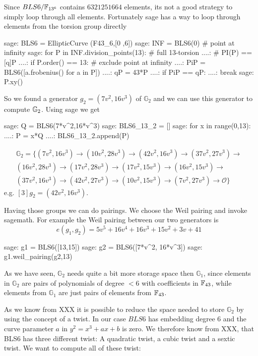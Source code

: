 Since $BLS6/\mathbb{F}_{13^6}$ contains $6321251664$ elements, its not a good strategy to simply loop through all elements. Fortunately sage has a way to loop through elements from the torsion group directly
\begin{sagecommandline}
sage: BLS6 = EllipticCurve (F43_6,[0 ,6])
sage: INF = BLS6(0) # point at infinity
sage: for P in INF.division_points(13): # full 13-torsion
....: # PI(P) == [q]P
....:     if P.order() == 13: # exclude point at infinity
....:         PiP = BLS6([a.frobenius() for a in P])
....:         qP = 43*P
....:         if PiP == qP:
....:             break
sage: P.xy()
\end{sagecommandline}
So we found a generator $g_2=(7v^2, 16v^3)$ of $\mathbb{G}_2$ and we can use this generator to compute $\mathbb{G}_2$. Using sage we get
\begin{sagecommandline}
sage: Q = BLS6(7*v^2,16*v^3)
sage: BLS6_13_2 = []
sage: for x in range(0,13):
....:     P = x*Q
....:     BLS6_13_2.append(P)
\end{sagecommandline}
\begin{multline*}
\mathbb{G}_2=\{
(7v^2, 16v^3) \to
(10v^2, 28v^3)\to
(42v^2, 16v^3)\to
(37v^2, 27v^3)\to\\
(16v^2, 28v^3)\to
(17v^2, 28v^3)\to
(17v^2, 15v^3)\to
(16v^2, 15v^3)\to\\
(37v^2, 16v^3)\to
(42v^2, 27v^3)\to
(10v^2, 15v^3)\to
(7v^2, 27v^3)\to
\mathcal{O}\}
\end{multline*}
e.g. $[3]g_2= (42v^2, 16v^3)$.

Having those groups we can do pairings. We choose the Weil pairing and invoke sagemath. For example the Weil pairing between our two generators is
$$
e(g_1,g_2)= 5v^5 + 16v^4 + 16v^3 + 15v^2 + 3v + 41
$$

\begin{sagecommandline}
sage: g1 = BLS6([13,15])
sage: g2 = BLS6([7*v^2, 16*v^3])
sage: g1.weil_pairing(g2,13)
\end{sagecommandline}

As we have seen, $\mathbb{G}_2$ needs quite a bit more storage space then $\mathbb{G}_1$, since elements in $\mathbb{G}_2$ are pairs of polynomials of degree $<6$ with coefficients in $\mathbb{F}_{43}$, while elements from $\mathbb{G}_1$ are just pairs of elements from $\mathbb{F}_{43}$. 

As we know from XXX it is possible to reduce the space needed to store $\mathbb{G}_2$ by using the concept of a twist. In our case $BLS6$ has embedding degree $6$ and the curve parameter $a$ in $y^2 = x^3 +ax + b$ is zero. We therefore know from XXX, that BLS6 has three different twist: A quadratic twist, a cubic twist and a sextic twist. We want to compute all of these twist:

